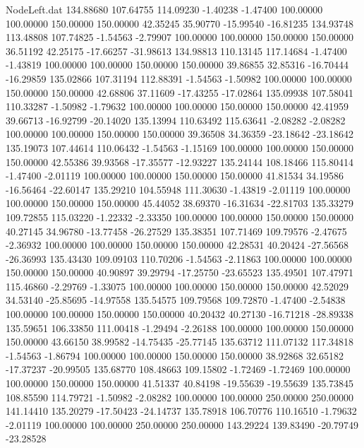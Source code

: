 \begin{filecontents}{NodeLeft.dat}
 134.88680  107.64755  114.09230    -1.40238   -1.47400  100.00000  100.00000  150.00000  150.00000   42.35245   35.90770  -15.99540  -16.81235
 134.93748  113.48808  107.74825    -1.54563   -2.79907  100.00000  100.00000  150.00000  150.00000   36.51192   42.25175  -17.66257  -31.98613
 134.98813  110.13145  117.14684    -1.47400   -1.43819  100.00000  100.00000  150.00000  150.00000   39.86855   32.85316  -16.70444  -16.29859
 135.02866  107.31194  112.88391    -1.54563   -1.50982  100.00000  100.00000  150.00000  150.00000   42.68806   37.11609  -17.43255  -17.02864
 135.09938  107.58041  110.33287    -1.50982   -1.79632  100.00000  100.00000  150.00000  150.00000   42.41959   39.66713  -16.92799  -20.14020
 135.13994  110.63492  115.63641    -2.08282   -2.08282  100.00000  100.00000  150.00000  150.00000   39.36508   34.36359  -23.18642  -23.18642
 135.19073  107.44614  110.06432    -1.54563   -1.15169  100.00000  100.00000  150.00000  150.00000   42.55386   39.93568  -17.35577  -12.93227
 135.24144  108.18466  115.80414    -1.47400   -2.01119  100.00000  100.00000  150.00000  150.00000   41.81534   34.19586  -16.56464  -22.60147
 135.29210  104.55948  111.30630    -1.43819   -2.01119  100.00000  100.00000  150.00000  150.00000   45.44052   38.69370  -16.31634  -22.81703
 135.33279  109.72855  115.03220    -1.22332   -2.33350  100.00000  100.00000  150.00000  150.00000   40.27145   34.96780  -13.77458  -26.27529
 135.38351  107.71469  109.79576    -2.47675   -2.36932  100.00000  100.00000  150.00000  150.00000   42.28531   40.20424  -27.56568  -26.36993
 135.43430  109.09103  110.70206    -1.54563   -2.11863  100.00000  100.00000  150.00000  150.00000   40.90897   39.29794  -17.25750  -23.65523
 135.49501  107.47971  115.46860    -2.29769   -1.33075  100.00000  100.00000  150.00000  150.00000   42.52029   34.53140  -25.85695  -14.97558
 135.54575  109.79568  109.72870    -1.47400   -2.54838  100.00000  100.00000  150.00000  150.00000   40.20432   40.27130  -16.71218  -28.89338
 135.59651  106.33850  111.00418    -1.29494   -2.26188  100.00000  100.00000  150.00000  150.00000   43.66150   38.99582  -14.75435  -25.77145
 135.63712  111.07132  117.34818    -1.54563   -1.86794  100.00000  100.00000  150.00000  150.00000   38.92868   32.65182  -17.37237  -20.99505
 135.68770  108.48663  109.15802    -1.72469   -1.72469  100.00000  100.00000  150.00000  150.00000   41.51337   40.84198  -19.55639  -19.55639
 135.73845  108.85590  114.79721    -1.50982   -2.08282  100.00000  100.00000  250.00000  250.00000  141.14410  135.20279  -17.50423  -24.14737
 135.78918  106.70776  110.16510    -1.79632   -2.01119  100.00000  100.00000  250.00000  250.00000  143.29224  139.83490  -20.79749  -23.28528

\end{filecontents}
